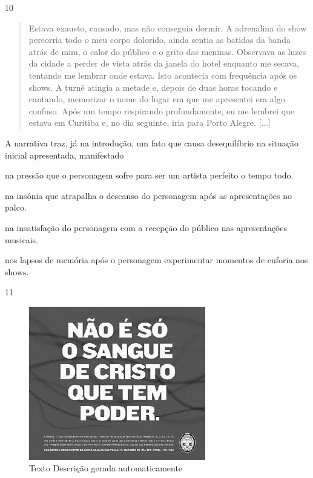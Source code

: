 \num{10}

\begin{quote}
Estava exausto, cansado, mas não conseguia dormir. A adrenalina do show
percorria todo o meu corpo dolorido, ainda sentia as batidas da banda
atrás de mim, o calor do público e o grito das meninas. Observava as
luzes da cidade a perder de vista atrás da janela do hotel enquanto me
secava, tentando me lembrar onde estava. Isto acontecia com frequência
após os shows. A turnê atingia a metade e, depois de duas horas tocando
e cantando, memorizar o nome do lugar em que me apresentei era algo
confuso. Após um tempo respirando profundamente, eu me lembrei que
estava em Curitiba e, no dia seguinte, iria para Porto Alegre. {[}...{]}
\end{quote}


A narrativa traz, já na introdução, um fato que causa desequilíbrio na
situação inicial apresentada, manifestado

\begin{escolha}
\item na pressão que o personagem sofre para ser um artista perfeito o
tempo todo.

\item na insônia que atrapalha o descanso do personagem após as
apresentações no palco.

\item na insatisfação do personagem com a recepção do público nas
apresentações musicais.

\item nos lapsos de memória após o personagem experimentar momentos de
euforia nos shows.
\end{escolha}

\num{11}

\begin{figure}
\centering
\includegraphics[width=3.03125in,height=2.63521in]{./imgSAEB_8_POR/media/image36.png}
\caption{Texto Descrição gerada automaticamente}
\end{figure}

